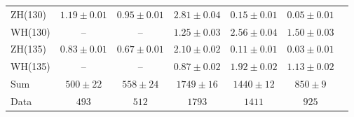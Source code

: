 \documentclass[11pt,twoside,a4paper,cmspaper,final,collab]{cms-tdr}
\begin{document}
\begin{table}[tbp]
\begin{center}
{\begin{tabular}{lcccccc}
ZH(130) & $1.19 \pm 0.01$ & $0.95 \pm 0.01$ & $2.81\pm 0.04$ & $0.15\pm 0.01$ & $0.05\pm 0.01$ \\
WH(130) & -- & -- & $1.25\pm 0.03$ & $2.56\pm 0.04$ & $1.50\pm 0.03$    \\
ZH(135) & $0.83 \pm 0.01$ & $0.67 \pm 0.01$ & $2.10\pm 0.02$ & $0.11\pm 0.01$ & $0.03\pm 0.01$ \\
WH(135) & -- & -- & $0.87\pm 0.02$ & $1.92\pm 0.02$ & $1.13\pm 0.02$    \\
\hline
Sum  &$500 \pm 22$ &$558 \pm 24$ & $1749 \pm 16$ & $1440\pm 12$ & $850\pm 9$ \\\hline
Data &    $ 493 $ & $512$ & $1793$ &  $1411$ & $925$  \\\hline

\end{tabular}
}
\end{center}
\end{table}
\end{document}
